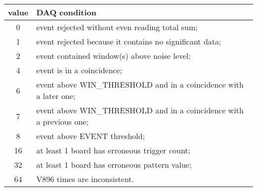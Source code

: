 \btab
\begin{tabular}{c|l}
\hline
  value       &      DAQ condition\\
\hline 
 0 & event rejected without even reading total sum;\\
 1 & event rejected because it contains no significant data;\\
 2 & event contained window(s) above noise level;\\
 4 & event is in a coincidence;\\
 6 & event above WIN\_THRESHOLD and in a coincidence with a later one;\\
 7 & event above WIN\_THRESHOLD and in a coincidence with a previous one;\\
 8 & event above EVENT threshold;\\
16 & at least 1 board has erroneous trigger count;\\
32 & at least 1 board has erroneous pattern value;\\
64 & V896 times are inconsistent.\\
\hline 
\end{tabular}
\etab

\pagebreak[4]

